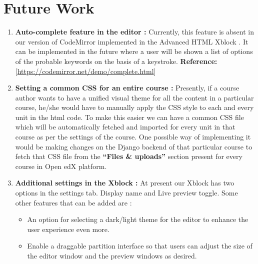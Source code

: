 \chapter {Future Work}
\begin{enumerate}
\item \textbf{Auto-complete feature in the editor :} \newline
Currently, this feature is absent in our version of CodeMirror implemented in the Advanced
HTML Xblock . It can be implemented in the future where a user will be shown a list of
options of the probable keywords on the basis of a keystroke.
\newline\newline  \textbf{Reference:} [\url{https://codemirror.net/demo/complete.html}]
\item \textbf{Setting a common CSS for an entire course :} \newline
Presently, if a course author wants to have a unified visual theme for all the content in a particular
course, he/she would have to manually apply the CSS style to each and every unit in the html
code. To make this easier we can have a common CSS file which will be automatically
fetched and imported for every unit in that course as per the settings of the course. One
possible way of implementing it would be making changes on the Django backend of that
particular course to fetch that CSS file from the \textbf{ “Files \& uploads”} section present for every
course in Open edX platform.
\item \textbf{Additional settings in the Xblock :}\newline
At present our Xblock has two options in the settings tab. Display name and Live preview
toggle. Some other features that can be added are :
\begin{itemize}
\item An option for selecting a dark/light theme for the editor to enhance the user experience
even more.
\item Enable a draggable partition interface so that users can adjust the size of the editor
window and the preview windows as desired.
\end{itemize}
\end{enumerate}